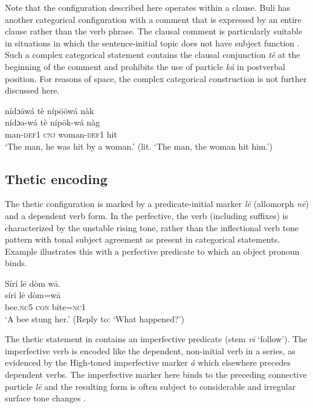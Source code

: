 \documentclass[output=paper]{langsci/langscibook}
\begin{document}
Note that the configuration described here operates within a clause. Buli has another categorical configuration with a comment that is expressed by an entire clause rather than the verb phrase. The clausal comment is particularly suitable in situations in which the sentence-initial topic does not have subject function . Such a complex categorical statement contains the clausal conjunction \textit{tè} at the beginning of the comment and prohibits the use of particle \textit{ká} in postverbal position. For reasons of space, the complex categorical construction is not further discussed here.

\ea\label{ex:schwarz:13}
\glll   nídɔ\={a}wá  tè  níp\={o}\={o}wá  nàk\\
  \textup{nídɔa-wá}  tè  níp\={o}k-wá  {nàg}\\
man-\textsc{def}1  \textsc{cnj}  woman-\textsc{def}1  hit\\
\glt ‘The man, he was hit by a woman.’ (lit. ‘The man, the woman hit him.’) 
\z

\subsection{Thetic encoding}\label{sec:schwarz:3.3}

The thetic configuration is marked by a predicate-initial marker \textit{l\={e}} (allomorph \textit{n\={e}}) and a dependent verb form. In the perfective, the verb (including suffixes) is characterized by the unstable rising tone, rather than the inflectional verb tone pattern with tonal subject agreement as present in categorical statements. Example  illustrates this with a perfective predicate to which an object pronoun binds.

\ea\label{ex:schwarz:14}
\glll   Sírí    l\={e}  {dòm  w\={a}.}\\
    \textup{síri}    l\={e}  {dòm{=}w\={a}}\\
       bee.\textsc{nc}5  \textsc{con}  bite{=}\textsc{nc}1\\
\glt ‘A bee stung her.’ (Reply to: ‘What happened?’)
\z

The thetic statement in  contains an imperfective predicate (stem \textit{v\={i}} ‘follow’). The imperfective verb is encoded like the dependent, non-initial verb in a series, as evidenced by the High-toned imperfective marker \textit{á} which elsewhere precedes dependent verbs. The imperfective marker here binds to the preceding connective particle \textit{l\={e}} and the resulting form is often subject to considerable and irregular surface tone changes \citep{Schwarz2007}.
\end{document}
